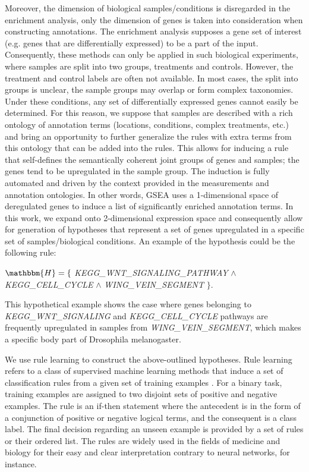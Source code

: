 \documentclass{bmcart}
\begin{document}
Moreover, the dimension of biological samples/conditions is disregarded in the enrichment analysis, only the dimension of genes is taken into consideration when constructing annotations. The enrichment analysis supposes a gene set of interest (e.g. genes that are differentially expressed) to be a part of the input. Consequently, these methods can only be applied in such biological experiments, where samples are split into two groups, treatments and controls. However, the treatment and control labels are often not available. In most cases, the split into groups is unclear, the sample groups may overlap or form complex taxonomies. Under these conditions, any set of differentially expressed genes cannot easily be determined. For this reason, we suppose that samples are described with a rich ontology of annotation terms (locations, conditions, complex treatments, etc.) and bring an opportunity to further generalize the rules with extra terms from this ontology that can be added into the rules. This allows for inducing a rule that self-defines the semantically coherent joint groups of genes and samples; the genes tend to be upregulated in the sample group. The induction is fully automated and driven by the context provided in the measurements and annotation ontologies. In other words, GSEA uses a 1-dimensional space of deregulated genes to induce a list of significantly enriched annotation terms. In this work, we expand onto 2-dimensional expression space and consequently allow for generation of hypotheses that represent a set of genes upregulated in a specific set of samples/biological conditions. An example of the hypothesis could be the following rule:
\begin{center}
$\mathbbm{H}= \{$ \emph{KEGG\_WNT\_SIGNALING\_PATHWAY} $\wedge$ \emph{KEGG\_CELL\_CYCLE}  $\wedge$ \emph{WING\_VEIN\_SEGMENT} $\}$.
\end{center}
This hypothetical example shows the case where genes belonging to \emph{KEGG\_WNT\_SIGNALING} and \emph{KEGG\_CELL\_CYCLE} pathways are frequently upregulated in samples from \emph{WING\_VEIN\_SEGMENT}, which makes a specific body part of Drosophila melanogaster. 

We use rule learning to construct the above-outlined hypotheses. Rule learning refers to a class of supervised machine learning methods that induce a set of classification rules from a given set of training examples \cite{kotsiantis2007supervised}. For a binary task, training examples are assigned to two disjoint sets of positive and negative examples. The rule is an if-then statement where the antecedent is in the form of a conjunction of positive or negative logical terms, and the consequent is a class label. The final decision regarding an unseen example is provided by a set of rules or their ordered list. The rules are widely used in the fields of medicine and biology for their easy and clear interpretation \cite{hvidsten2003learning,calzone2006machine,bellazzi2008predictive} contrary to neural networks, for instance. 
\end{document}
